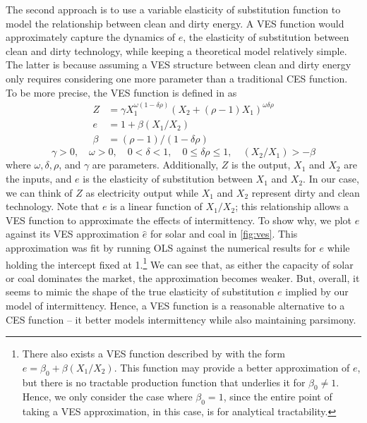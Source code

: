 \documentclass[11pt,a4paper,leqno]{extarticle}
\begin{document}
	
	The second approach is to use a variable elasticity of substitution function to model the relationship between clean and dirty energy.  A VES function would approximately capture the dynamics of $e$, the elasticity of substitution between clean and dirty technology,  while keeping a theoretical model relatively simple. The latter is because assuming a VES structure between clean and dirty energy only requires considering one more parameter than a traditional CES function. To be more precise, the VES function is defined in \citet{VES} as
	\begin{align}
	Z &= \gamma X_1^{\omega(1-\delta \rho)} \left( X_2 + (\rho - 1) X_1 \right)^{\omega \delta \rho} \\
	e &= 1 + \beta (X_1 / X_2) \\
	\beta &= (\rho - 1) / ( 1- \delta \rho ) 
	\end{align}
	\vspace{-4ex}
	$$\gamma > 0, \quad \omega > 0, \quad0 < \delta < 1, \quad 0 \leq \delta \rho \leq 1 , \quad (X_2/X_1) >  -\beta $$
	where $\omega, \delta, \rho$, and $\gamma$ are parameters. Additionally, $Z$ is the output, $X_1$ and $X_2$ are the inputs, and $e$ is the elasticity of substitution between $X_1$ and $X_2$. In our case, we can think of $Z$ as electricity output while $X_1$ and $X_2$ represent dirty and clean technology. Note that $e$ is a linear function of $X_1/X_2$; this relationship allows a VES function to approximate the effects of intermittency. To show why, we plot $e$ against its VES approximation $\hat{e}$ for solar and coal in \autoref{fig:ves}. This approximation was fit by running OLS against the numerical results for $e$ while holding the intercept fixed at 1.\footnote{ There also exists a VES function described by \citet{VES} with the form $e = \beta_0 + \beta (X_1/X_2)$. This function may provide a better approximation of $e$, but there is no tractable production function that underlies it for $\beta_0 \neq 1$. Hence, we only consider the case where $\beta_0 = 1$, since the entire point of taking a VES approximation, in this case, is for analytical tractability. } We can see that, as either the capacity of solar or coal dominates the market, the approximation becomes weaker. But, overall, it seems to mimic the shape of the true elasticity of substitution $e$ implied by our model of intermittency. Hence, a  VES function is a reasonable alternative to a CES function -- it better models intermittency while also maintaining parsimony. 
	
\end{document}
